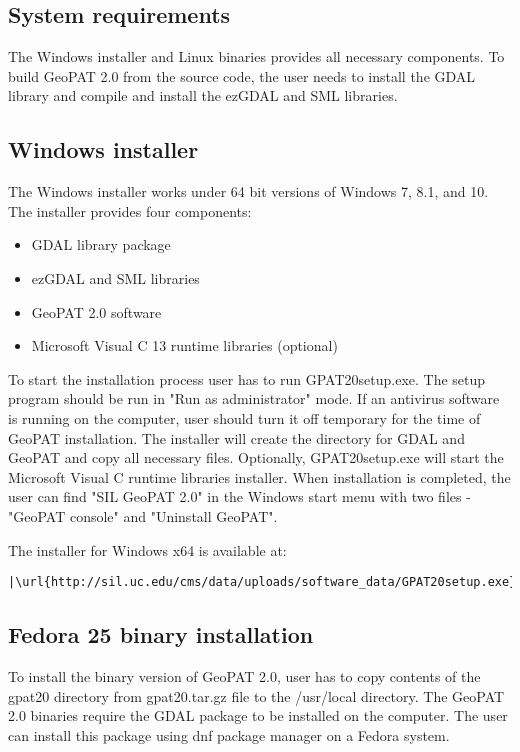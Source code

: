 \subsection{System requirements}

The Windows installer and Linux binaries provides all necessary components. 
To build GeoPAT 2.0 from the source code, the user needs to install the GDAL library and compile and install the ezGDAL and SML libraries.

\subsection{Windows installer}
The Windows installer works under 64 bit versions of Windows 7, 8.1, and 10.
The installer provides four components:
\begin{itemize}
  \item{GDAL library package}
  \item{ezGDAL and SML libraries}
  \item{GeoPAT 2.0 software}
  \item{Microsoft Visual C 13 runtime libraries (optional)}
\end{itemize}
To start the installation process user has to run GPAT20setup.exe.
The setup program should be run in "Run as administrator" mode.
If an antivirus software is running on the computer, user should turn it off temporary for the time of GeoPAT installation.
The installer will create the directory for GDAL and GeoPAT and copy all necessary files.
Optionally, GPAT20setup.exe will start the Microsoft Visual C runtime libraries installer.
When installation is completed, the user can find "SIL GeoPAT 2.0" in the Windows start menu with two files - "GeoPAT console" and "Uninstall GeoPAT".

The installer for Windows x64 is available at:

\begin{lstlisting}[escapechar=|]
|\url{http://sil.uc.edu/cms/data/uploads/software_data/GPAT20setup.exe}|
\end{lstlisting}

\subsection{Fedora 25 binary installation}
To install the binary version of GeoPAT 2.0, user has to copy contents of the gpat20 directory from gpat20.tar.gz file to the /usr/local directory.
The GeoPAT 2.0 binaries require the GDAL package to be installed on the computer.
The user can install this package using dnf package manager on a Fedora system.

